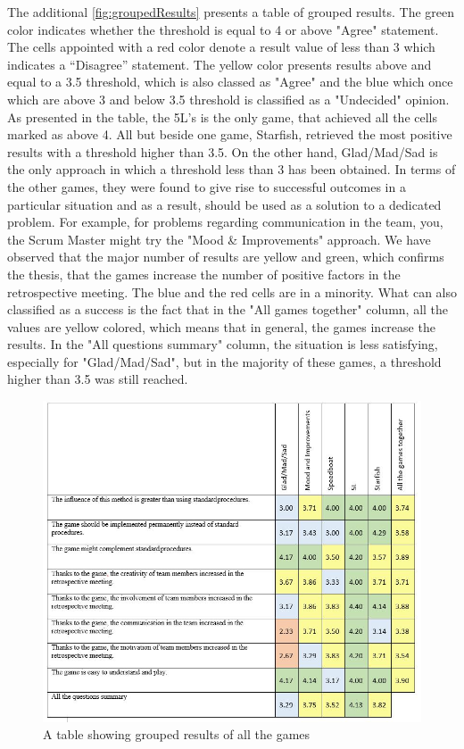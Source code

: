 The additional \autoref{fig:groupedResults} presents a table of grouped results. The green color indicates whether the threshold is equal to 4 or above "Agree" statement. The cells appointed with a red color denote a result value of less than 3 which indicates a “Disagree” statement. The yellow color presents results above and equal to a 3.5 threshold, which is also classed as "Agree" and the blue which once which are above 3 and below 3.5 threshold is classified as a "Undecided" opinion. As presented in the table, the 5L’s is the only game, that achieved all the cells marked as above 4. All but beside one game, Starfish, retrieved the most positive results with a threshold higher than 3.5. On the other hand, Glad/Mad/Sad is the only approach in which a threshold less than 3 has been obtained. In terms of the other games, they were found to give rise to successful outcomes in a particular situation and as a result, should be used as a solution to a dedicated problem. For example, for problems regarding communication in the team, you, the Scrum Master might try the "Mood \& Improvements" approach. We have observed that the major number of results are yellow and green, which confirms the thesis, that the games increase the number of positive factors in the retrospective meeting. The blue and the red cells are in a minority. What can also classified as a success is the fact that in the "All games together" column, all the values are yellow colored, which means that in general, the games increase the results. In the "All questions summary" column, the situation is less satisfying, especially for "Glad/Mad/Sad", but in the majority of these games, a threshold higher than 3.5 was still reached.


\begin{figure}[!htbp]
\caption{A table showing grouped results of all the games}
\label{fig:groupedResults}
\centering
\includegraphics[width=1\textwidth]{charts/groupedResults}
\end{figure}